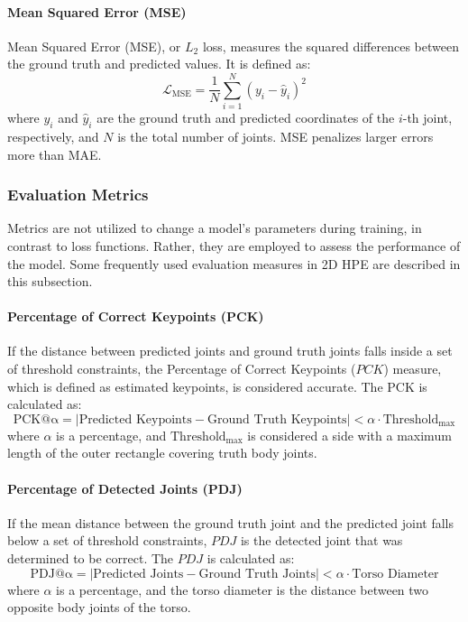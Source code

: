 \paragraph{Mean Squared Error (MSE)}
Mean Squared Error (MSE), or $L_2$ loss, measures the squared differences between the ground truth and predicted values. It is defined as:
\begin{equation}
    \mathcal{L}_{\text{MSE}} = \frac{1}{N} \sum_{i=1}^{N} (y_i - \hat{y}_i)^2
\end{equation}
where $y_i$ and $\hat{y}_i$ are the ground truth and predicted coordinates of the $i$-th joint, respectively, and $N$ is the total number of joints. MSE penalizes larger errors more than MAE.

\subsubsection{Evaluation Metrics}
Metrics are not utilized to change a model's parameters during training, in contrast to loss functions. Rather, they are employed to assess the performance of the model. Some frequently used evaluation measures in 2D HPE are described in this subsection.

\paragraph{Percentage of Correct Keypoints (PCK)}
If the distance between predicted joints and ground truth joints falls inside a set of threshold constraints, the Percentage of Correct Keypoints ($PCK$) measure, which is defined as estimated keypoints, is considered accurate.
The PCK is calculated as:
\begin{equation}
    \mathrm{PCK@\alpha} =
    \left|
    \text{Predicted Keypoints} - \text{Ground Truth Keypoints}
    \right|
    < \alpha \cdot \text{Threshold}_{\text{max}}
\end{equation}
where $\alpha$ is a percentage, and $\text{Threshold}_{\text{max}}$ is considered a side with a maximum length of the outer rectangle covering truth body joints.

\paragraph{Percentage of Detected Joints (PDJ)}
If the mean distance between the ground truth joint and the predicted joint falls below a set of threshold constraints, $PDJ$ is the detected joint that was determined to be correct.
The $PDJ$ is calculated as:
\begin{equation}
    \mathrm{PDJ@\alpha} =
    \left|
    \text{Predicted Joints} - \text{Ground Truth Joints}
    \right|
    < \alpha \cdot \text{Torso Diameter}
\end{equation}
where $\alpha$ is a percentage, and the torso diameter is the distance between two opposite body joints of the torso.

